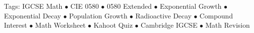 \documentclass[11pt,a4paper]{article}
\begin{document}
\vspace{14pt}
\begin{center}
  \sffamily\scriptsize\textcolor{textmuted}{
    Tags: IGCSE Math $\bullet$ CIE 0580 $\bullet$ 0580 Extended $\bullet$ Exponential Growth $\bullet$ Exponential Decay $\bullet$ Population Growth $\bullet$ Radioactive Decay $\bullet$ Compound Interest $\bullet$ Math Worksheet $\bullet$ Kahoot Quiz $\bullet$ Cambridge IGCSE $\bullet$ Math Revision
  }
\end{center}
\end{document}
